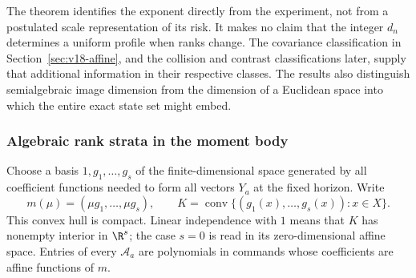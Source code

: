 The theorem identifies the exponent directly from the experiment, not
from a postulated scale representation of its risk. It makes no claim
that the integer $d_n$ determines a uniform profile when ranks change.
The covariance classification in Section~\ref{sec:v18-affine}, and the
collision and contrast classifications later, supply that additional
information in their respective classes. The results also distinguish
semialgebraic image dimension from the dimension of a Euclidean space
into which the entire exact state set might embed.

\subsubsection{Algebraic rank strata in the moment body}
Choose a basis $1,g_1,\ldots,g_s$ of the finite-dimensional space
generated by all coefficient functions needed to form all vectors
$Y_a$ at the fixed horizon. Write
\[
 m(\mu)=(\mu g_1,\ldots,\mu g_s),\qquad
 K=\operatorname{conv}\{(g_1(x),\ldots,g_s(x)):x\in X\}.
\]
This convex hull is compact. Linear independence with $1$ means that
$K$ has nonempty interior in $\R^s$; the case $s=0$ is read in its
zero-dimensional affine space. Entries of every $\mathcal A_a$ are
polynomials in commands whose coefficients are affine functions of $m$.

